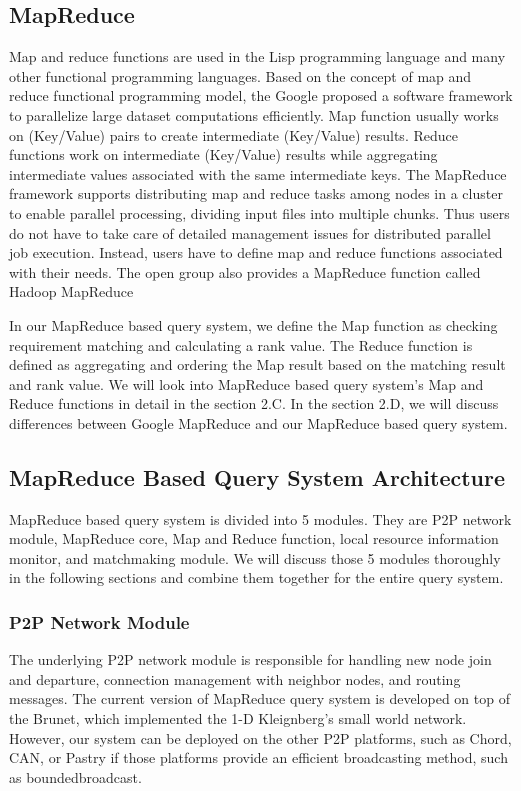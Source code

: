 \documentclass{acm_proc_article-sp}
\begin{document}
\subsection{MapReduce}
Map and reduce functions are used in the Lisp programming language and many other functional programming languages. 
Based on the concept of map and reduce functional programming model, the Google proposed a software framework to parallelize large dataset computations efficiently\cite{google_mapreduce}.
Map function usually works on (Key/Value) pairs to create intermediate (Key/Value) results. 
Reduce functions work on intermediate (Key/Value) results while aggregating intermediate values associated with the same intermediate keys.
The MapReduce framework supports distributing map and reduce tasks among nodes in a cluster to enable parallel processing, dividing input files into multiple chunks. 
Thus users do not have to take care of detailed management issues for distributed parallel job execution. 
Instead, users have to define map and reduce functions associated with their needs.
The open group also provides a MapReduce function called Hadoop MapReduce\cite{hadoop}

In our MapReduce based query system, we define the Map function as checking requirement matching and calculating a rank value. The Reduce function is defined as 
aggregating and ordering the Map result based on the matching result and rank value. We will look into MapReduce based query system's Map and Reduce functions in detail in the section 2.C. 
In the section 2.D, we will discuss differences between Google MapReduce and our MapReduce based query system.

\subsection{MapReduce Based Query System Architecture}
MapReduce based query system is divided into 5 modules. They are P2P network module, MapReduce core, Map and Reduce function, local resource information monitor, and matchmaking module.
We will discuss those 5 modules thoroughly in the following sections and combine them together for the entire query system.
\subsubsection{P2P Network Module}
The underlying P2P network module is responsible for handling new node join and departure, connection management with neighbor nodes, and routing messages. 
The current version of MapReduce query system is developed on top of the Brunet\cite{brunet}, which implemented the 1-D Kleignberg's small world network\cite{small_world_network}.
However, our system can be deployed on the other P2P platforms, such as Chord\cite{chord}, CAN\cite{can}, or Pastry\cite{pastry} if those platforms
provide an efficient broadcasting method, such as boundedbroadcast. 
\end{document}
